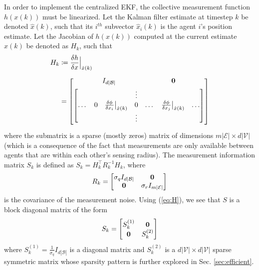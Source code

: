 \documentclass[twocolumn]{article}
\theoremstyle{plain}
\theoremstyle{definition}
\theoremstyle{definition}
\theoremstyle{remark}
\begin{document}
In order to implement the centralized EKF, the collective measurement function $h(x(k))$ must be linearized. Let the Kalman filter estimate at timestep $k$ be denoted $\hat x (k)$, such that its $i^{th}$ subvector $\hat x_i(k)$ is the agent $i$'s position estimate. 
Let the Jacobian of $h(x(k))$ computed at the current estimate $\hat x(k)$ be denoted as $H_k$, such that
\begin{align}
    H_k &\coloneqq \frac{\delta h}{\delta x}\Big\rvert_{\hat x(k)}\\[5pt]
    &= \begin{bmatrix}
    I_{d|\mathcal B|} \qquad \qquad \qquad \qquad \bold 0 \vspace{3pt}
    \\
    \vspace{3pt}
 \begin{bmatrix}
    & & & \vdots &  &  \\
    \dots & 0 & \frac{\delta \phi}{\delta x_i}\big\rvert_{\hat x (k)} & 0 & \dots & \frac{\delta \phi}{\delta x_j}\big\rvert_{\hat x(k)} & \dots \\
     & &  & \vdots  & & 
    \end{bmatrix}
    \end{bmatrix}
\label{eq:H}
\end{align}
where the submatrix is a sparse (mostly zeros) matrix of dimensions $m|\mathcal E| \times d |\mathcal V|$ (which is a consequence of the fact that measurements are only available between agents that are within each other's sensing radius). The measurement information matrix $S_k$ is defined as $S_k = H_k^\top R_k^{-1}H_k$, where
\begin{equation}
    R_k = \begin{bmatrix} 
    \sigma_q I_{d|\mathcal B|} & \bold 0\\
    \bold 0 & \sigma _r I_{m|\mathcal E|}
    \end{bmatrix}
\end{equation}
is the covariance of the measurement noise.
Using (\ref{eq:H}), we see that $S$ is a block diagonal matrix of the form
\begin{align}
    S_k = \begin{bmatrix}
    S^{(1)}_{k} & \bold 0 \\
    \bold 0 & S^{(2)}_{k}
    \end{bmatrix}
    \label{eq:Iblock}
\end{align}
where $S^{(1)}_{k} =\tfrac{1}{\sigma _q} I_{d |\mathcal B|}$ is a diagonal matrix and $S^{(2)}_{k}$ is a $d|\mathcal V| \times d|\mathcal V|$ sparse symmetric matrix whose sparsity pattern is further explored in Sec. \ref{sec:efficient}. 
\end{document}
